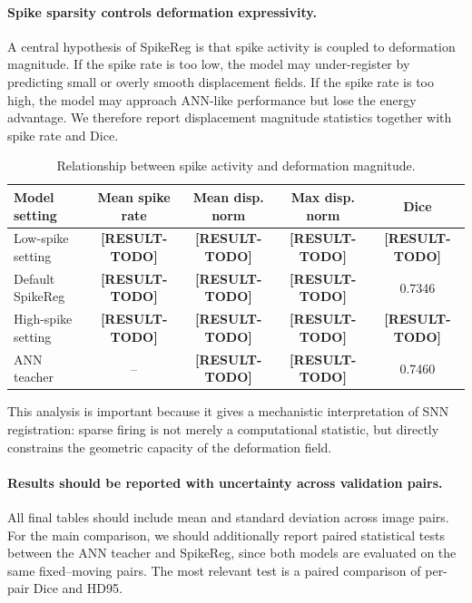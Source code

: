 
\paragraph{Spike sparsity controls deformation expressivity.}
A central hypothesis of SpikeReg is that spike activity is coupled to deformation magnitude. If the spike rate is too low, the model may under-register by predicting small or overly smooth displacement fields. If the spike rate is too high, the model may approach ANN-like performance but lose the energy advantage. We therefore report displacement magnitude statistics together with spike rate and Dice.

\begin{table}[t]
\centering
\caption{
Relationship between spike activity and deformation magnitude.
}
\label{tab:spike_deformation}
\begin{tabular}{lcccc}
\hline
Model setting & Mean spike rate & Mean disp. norm & Max disp. norm & Dice \\
\hline
Low-spike setting & \textbf{[RESULT-TODO]} & \textbf{[RESULT-TODO]} & \textbf{[RESULT-TODO]} & \textbf{[RESULT-TODO]} \\
Default SpikeReg & \textbf{[RESULT-TODO]} & \textbf{[RESULT-TODO]} & \textbf{[RESULT-TODO]} & 0.7346 \\
High-spike setting & \textbf{[RESULT-TODO]} & \textbf{[RESULT-TODO]} & \textbf{[RESULT-TODO]} & \textbf{[RESULT-TODO]} \\
ANN teacher & -- & \textbf{[RESULT-TODO]} & \textbf{[RESULT-TODO]} & 0.7460 \\
\hline
\end{tabular}
\end{table}

This analysis is important because it gives a mechanistic interpretation of SNN registration: sparse firing is not merely a computational statistic, but directly constrains the geometric capacity of the deformation field.


\paragraph{Results should be reported with uncertainty across validation pairs.}
All final tables should include mean and standard deviation across image pairs. For the main comparison, we should additionally report paired statistical tests between the ANN teacher and SpikeReg, since both models are evaluated on the same fixed--moving pairs. The most relevant test is a paired comparison of per-pair Dice and HD95.

